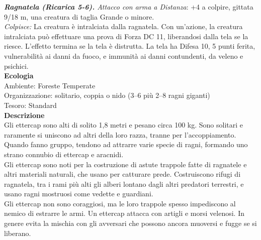 \begin{multicols}{2}
\emph{\textbf{Ragnatela (Ricarica 5-6).} Attacco con arma a Distanza}: +4 a colpire, gittata 9/18 m, una creatura di taglia Grande o minore.\\
\emph{Colpisce:} La creatura è intralciata dalla ragnatela. Con un'azione, la creatura intralciata può effettuare una prova di Forza DC 11, liberandosi dalla tela se la riesce. L'effetto termina se la tela è distrutta. La tela ha Difesa 10, 5 punti ferita, vulnerabilità ai danni da fuoco, e immunità ai danni contundenti, da veleno e psichici.\\
\textbf{Ecologia}\\
Ambiente: Foreste Temperate\\
Organizzazione: solitario, coppia o nido (3–6 più 2–8 ragni giganti)\\
Tesoro: Standard\\
\textbf{Descrizione}\\
Gli ettercap sono alti di solito 1,8 metri e pesano circa 100 kg. Sono solitari e raramente si uniscono ad altri della loro razza, tranne per l’accoppiamento. Quando fanno gruppo, tendono ad attrarre varie specie di ragni, formando uno strano connubio di ettercap e aracnidi.\\
Gli ettercap sono noti per la costruzione di astute trappole fatte di ragnatele e altri materiali naturali, che usano per catturare prede. Costruiscono rifugi di ragnatela, tra i rami più alti gli alberi lontano dagli altri predatori terrestri, e usano ragni mostruosi come vedette e guardiani.\\
Gli ettercap non sono coraggiosi, ma le loro trappole spesso impediscono al nemico di estrarre le armi. Un ettercap attacca con artigli e morsi velenosi. In genere evita la mischia con gli avversari che possono ancora muoversi e fugge se si liberano.\\


\end{multicols}

